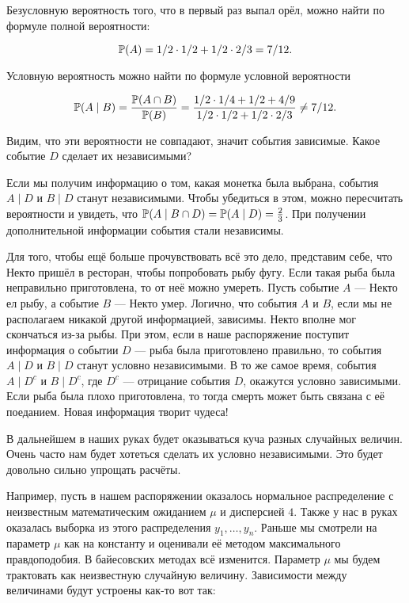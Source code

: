 Безусловную вероятность того, что в первый раз выпал орёл, можно найти по формуле полной вероятности:

\[\mathbb{P}(A) = 1/2 \cdot 1/2 + 1/2 \cdot 2/3 = 7/12. \]

Условную вероятность можно найти по формуле условной вероятности

\[\mathbb{P}(A \mid B) = \frac{\mathbb{P}(A \cap B)}{\mathbb{P}(B)} = \frac{1/2 \cdot 1/4 + 1/2 + 4/9}{1/2 \cdot 1/2 + 1/2 \cdot 2/3} \neq 7/12.\]

Видим, что эти вероятности не совпадают, значит события зависимые. Какое событие $D$ сделает их независимыми?

 Если мы получим информацию о том, какая монетка была выбрана, события $A \mid D$ и $B \mid D$ станут независимыми. Чтобы убедиться в этом, можно пересчитать  вероятности и увидеть, что $\mathbb{P}(A \mid B \cap D) = \mathbb{P}(A \mid D) = \frac{2}{3}$. При получении дополнительной информации события стали независимы.

Для того, чтобы ещё больше прочувствовать всё это дело, представим себе, что Некто пришёл в ресторан, чтобы попробовать рыбу фугу. Если такая рыба была неправильно приготовлена, то от неё можно умереть. Пусть событие $A$ ---  Некто ел рыбу, а событие $B$ --- Некто умер. Логично, что события $A$ и $B$, если мы не располагаем никакой другой информацией, зависимы. Некто вполне мог скончаться из-за рыбы. При этом, если в наше распоряжение поступит информация о событии $D$ --- рыба была приготовлено правильно, то события $A \mid D$ и $B \mid D$ станут условно независимыми. В то же самое время, события $A \mid  D^c$ и $B \mid D^c$, где $D^c$ --- отрицание события $D$, окажутся условно зависимыми. Если рыба была плохо приготовлена, то тогда смерть может быть связана с её поеданием. Новая информация творит чудеса!

В дальнейшем в наших руках  будет оказываться куча разных случайных величин. Очень часто нам будет хотеться сделать их условно независимыми. Это будет довольно сильно упрощать расчёты. 

Например, пусть в нашем распоряжении оказалось нормальное распределение с неизвестным математическим ожиданием $\mu$ и дисперсией $4$. Также у нас в руках оказалась выборка из этого распределения   $y_1, \ldots, y_n$.   Раньше мы смотрели на параметр $\mu$ как на константу и оценивали её методом максимального правдоподобия.  В байесовских методах всё изменится. Параметр $\mu$ мы будем трактовать как неизвестную случайную величину. Зависимости между величинами будут устроены как-то вот так:

